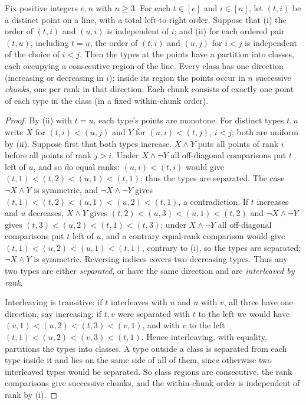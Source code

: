 \begin{lemma}
\label{lem:group-block-order}
Fix positive integers $e,n$ with $n\ge3$.  For each
$t\in[e]$ and $i\in[n]$, let $(t,i)$ be a distinct point
on a line, with a total left-to-right order.  Suppose that
(i) the order of $(t,i)$ and $(u,i)$ is independent of $i$;
and (ii) for each ordered pair $(t,u)$, including $t=u$,
the order of $(t,i)$ and $(u,j)$ for $i<j$ is independent
of the choice of $i<j$.
Then the types at the points have a partition into classes,
each occupying a consecutive region of the line.  Every
class has one direction (increasing or decreasing in $i$);
inside its region the points occur in $n$ successive
\emph{chunks}, one per rank in that direction.  Each
chunk consists of exactly one point of each type in the
class (in a fixed within-chunk order).
\end{lemma}
\begin{proof}
By (ii) with $t=u$, each type's points are monotone.  For distinct types
$t,u$ write $X$ for $(t,i)<(u,j)$ and $Y$ for $(u,i)<(t,j)$, $i<j$; both are
uniform by (ii).  Suppose first that both types increase.  $X\wedge Y$ puts
all points of rank $i$ before all points of rank $j>i$.  Under $X\wedge\neg Y$
all off-diagonal comparisons put $t$ left of $u$, and so do equal ranks:
$(u,i)<(t,i)$ would give $(t,1)<(t,2)<(u,1)<(t,1)$; thus the types are
separated.  The case $\neg X\wedge Y$ is symmetric, and $\neg X\wedge\neg Y$
gives $(t,1)<(t,2)<(u,1)<(u,2)<(t,1)$, a contradiction.  If $t$ increases and
$u$ decreases, $X\wedge Y$ gives $(t,2)<(u,3)<(u,1)<(t,2)$ and
$\neg X\wedge\neg Y$ gives $(t,3)<(u,2)<(t,1)<(t,3)$; under $X\wedge\neg Y$ all
off-diagonal comparisons put $t$ left of $u$, and a contrary equal-rank
comparison would give $(t,1)<(u,2)<(u,1)<(t,1)$, contrary to (i), so the types
are separated; $\neg X\wedge Y$ is symmetric.  Reversing indices covers two
decreasing types.  Thus any two types are either \emph{separated}, or have the
same direction and are \emph{interleaved by rank}.

Interleaving is transitive: if $t$ interleaves with $u$ and $u$ with $v$, all
three have one direction, say increasing; if $t,v$ were separated with $t$ to
the left we would have $(v,1)<(u,2)<(t,3)<(v,1)$, and with $v$ to the left
$(t,1)<(u,2)<(v,3)<(t,1)$.  Hence interleaving, with equality, partitions the
types into classes.  A type outside a class is separated from each type inside
it and lies on the same side of all of them, since otherwise two interleaved
types would be separated.  So class regions are consecutive, the rank
comparisons give successive chunks, and the within-chunk order is independent
of rank by (i).
\end{proof}

